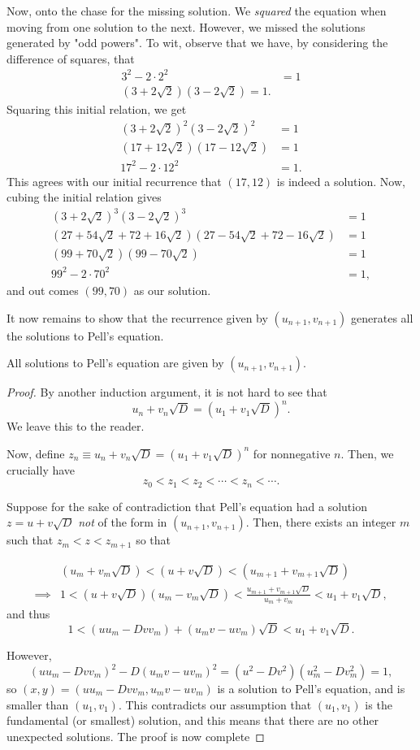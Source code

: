 \documentclass[../jarvis.tex]{subfiles}
\begin{document}
Now, onto the chase for the missing solution. We \textit{squared} the equation when moving from one solution to the next. However, we missed the solutions generated by "odd powers". To wit, observe that we have, by considering the difference of squares, that
\begin{align*}
    3^2-2\cdot2^2&=1 \\
    (3+2\sqrt{2})(3-2\sqrt{2})=1. 
\end{align*}
Squaring this initial relation, we get
\begin{align*}
    (3+2\sqrt{2})^2(3-2\sqrt{2})^2&=1 \\
    (17+12\sqrt{2})(17-12\sqrt{2})&=1 \\
    17^2-2\cdot12^2&=1.
\end{align*}
This agrees with our initial recurrence that $(17,12)$ is indeed a solution. Now, cubing the initial relation gives
\begin{align*}
    (3+2\sqrt{2})^3(3-2\sqrt{2})^3&=1 \\
    (27+54\sqrt{2}+72+16\sqrt{2})(27-54\sqrt{2}+72-16\sqrt{2})&=1 \\
    (99+70\sqrt{2})(99-70\sqrt{2})&=1\\
    99^2-2\cdot70^2&=1,
\end{align*}
and out comes $(99,70)$ as our solution.

It now remains to show that the recurrence given by $(u_{n+1},v_{n+1})$ generates all the solutions to Pell's equation.
\begin{lemma}
    All solutions to Pell's equation are given by $(u_{n+1},v_{n+1})$.
\end{lemma}
\begin{proof}
    By another induction argument, it is not hard to see that 
    $$u_n+v_n\sqrt{D}=(u_1+v_1\sqrt{D})^n.$$
    We leave this to the reader.
    
    Now, define $z_n\equiv u_n+v_n\sqrt{D}=(u_1+v_1\sqrt{D})^n$ for nonnegative $n$. Then, we crucially have
    $$z_0<z_1<z_2<\cdots<z_n<\cdots.$$
    
    Suppose for the sake of contradiction that Pell's equation had a solution $z=u+v\sqrt{D}$ \textit{not} of the form in $(u_{n+1},v_{n+1})$. Then, there exists an integer $m$ such that $z_m<z<z_{m+1}$ so that
    
    \begin{align*}
        &(u_m+v_m\sqrt{D})<(u+v\sqrt{D})<(u_{m+1}+v_{m+1}\sqrt{D}) \\
        \implies& 1<(u+v\sqrt{D})(u_m-v_m\sqrt{D})<\frac{u_{m+1}+v_{m+1}\sqrt{D}}{u_m+v_m}<u_1+v_1\sqrt{D},
    \end{align*}
    and thus
    $$1<(uu_m-Dvv_m)+(u_mv-uv_m)\sqrt{D}<u_1+v_1\sqrt{D}.$$
    
    However,
    $$(uu_m-Dvv_m)^2-D(u_mv-uv_m)^2=(u^2-Dv^2)(u_m^2-Dv_m^2)=1,$$
    so $(x,y)=(uu_m-Dvv_m,u_mv-uv_m)$ is a solution to Pell's equation, and is smaller than $(u_1,v_1)$. This contradicts our assumption that $(u_1,v_1)$ is the fundamental (or smallest) solution, and this means that there are no other unexpected solutions. The proof is now complete
\end{proof}
\end{document}
